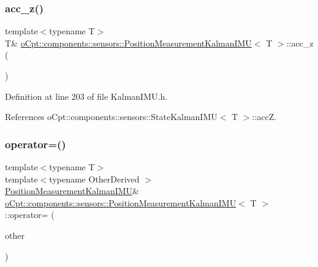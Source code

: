 \subsubsection{\texorpdfstring{acc\+\_\+z()}{acc\_z()}\hspace{0.1cm}{\footnotesize\ttfamily [2/2]}}
{\footnotesize\ttfamily template$<$typename T$>$ \\
T\& \hyperlink{classo_cpt_1_1components_1_1sensors_1_1_position_measurement_kalman_i_m_u}{o\+Cpt\+::components\+::sensors\+::\+Position\+Measurement\+Kalman\+I\+MU}$<$ T $>$\+::acc\+\_\+z (\begin{DoxyParamCaption}{ }\end{DoxyParamCaption})\hspace{0.3cm}{\ttfamily [inline]}}



Definition at line 203 of file Kalman\+I\+M\+U.\+h.



References o\+Cpt\+::components\+::sensors\+::\+State\+Kalman\+I\+M\+U$<$ T $>$\+::accZ.

\hypertarget{classo_cpt_1_1components_1_1sensors_1_1_position_measurement_kalman_i_m_u_a892171bfafe1c96187cce941badca9e2}{}\label{classo_cpt_1_1components_1_1sensors_1_1_position_measurement_kalman_i_m_u_a892171bfafe1c96187cce941badca9e2} 
\subsubsection{\texorpdfstring{operator=()}{operator=()}}
{\footnotesize\ttfamily template$<$typename T$>$ \\
template$<$typename Other\+Derived $>$ \\
\hyperlink{classo_cpt_1_1components_1_1sensors_1_1_position_measurement_kalman_i_m_u}{Position\+Measurement\+Kalman\+I\+MU}\& \hyperlink{classo_cpt_1_1components_1_1sensors_1_1_position_measurement_kalman_i_m_u}{o\+Cpt\+::components\+::sensors\+::\+Position\+Measurement\+Kalman\+I\+MU}$<$ T $>$\+::operator= (\begin{DoxyParamCaption}\item[{const Eigen\+::\+Matrix\+Base$<$ Other\+Derived $>$ \&}]{other }\end{DoxyParamCaption})\hspace{0.3cm}{\ttfamily [inline]}}



